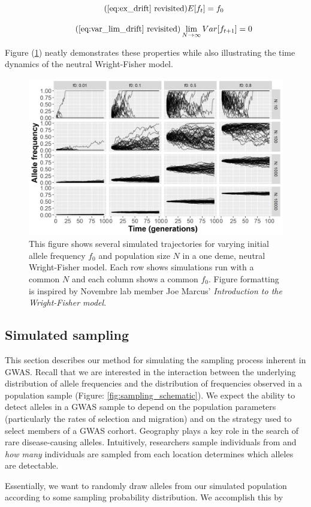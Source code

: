\begin{equation}
    \tag{\ref{eq:ex_drift} revisited}
    E[f_t] = f_0
\end{equation}

\begin{equation}
    \tag{\ref{eq:var_lim_drift} revisited}
    \lim_{N \to \infty} Var[f_{t+1}] = 0
\end{equation}


Figure (\ref{fig:neutral_wf}) neatly demonstrates these properties while also illustrating the time dynamics of the neutral Wright-Fisher model. 


\begin{figure}[h]
    \centering
    \includegraphics[scale=0.8]{img/neutral_wf.jpg}
    \caption{This figure shows several simulated trajectories for varying initial allele frequency $f_0$ and population size $N$ in a one deme, neutral Wright-Fisher model. Each row shows simulations run with a common $N$ and each column shows a common $f_0$. Figure formatting is inspired by Novembre lab member Joe Marcus' \textit{Introduction to the Wright-Fisher model}.\cite{marcus_2016}}
    \label{fig:neutral_wf}
\end{figure}




\newpage
\subsection{Simulated sampling}
This section describes our method for simulating the sampling process inherent in GWAS. Recall that we are interested in the interaction between the underlying distribution of allele frequencies and the distribution of frequencies observed in a population sample (Figure: \ref{fig:sampling_schematic}). We expect the ability to detect alleles in a GWAS sample to depend on the population parameters (particularly the rates of selection and migration) and on the strategy used to select members of a GWAS corhort. Geography plays a key role in the search of rare disease-causing alleles. Intuitively,  researchers sample individuals from and \textit{how many} individuals are sampled from each location determines which alleles are detectable.


Essentially, we want to randomly draw alleles from our simulated population according to some sampling probability distribution. We accomplish this by 





